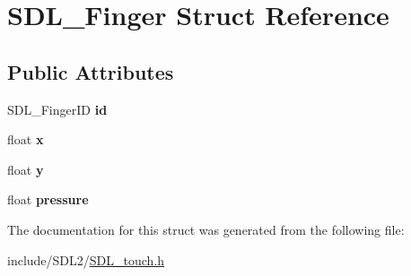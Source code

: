 \hypertarget{struct_s_d_l___finger}{}\section{S\+D\+L\+\_\+\+Finger Struct Reference}
\label{struct_s_d_l___finger}
\subsection*{Public Attributes}
\begin{DoxyCompactItemize}
\item 
\mbox{\label{struct_s_d_l___finger_a3cec630146eeec5bd6299a9387a6f16a}} 
S\+D\+L\+\_\+\+Finger\+ID {\bfseries id}
\item 
\mbox{\label{struct_s_d_l___finger_ab91dfbd03c3215560457fef44e1c7755}} 
float {\bfseries x}
\item 
\mbox{\label{struct_s_d_l___finger_a0a2c7a06ae641940111e03801c672cf9}} 
float {\bfseries y}
\item 
\mbox{\label{struct_s_d_l___finger_a0ecb50c7fd699d59899ac60c941bdee6}} 
float {\bfseries pressure}
\end{DoxyCompactItemize}


The documentation for this struct was generated from the following file\+:\begin{DoxyCompactItemize}
\item 
include/\+S\+D\+L2/\hyperlink{_s_d_l__touch_8h}{S\+D\+L\+\_\+touch.\+h}\end{DoxyCompactItemize}
